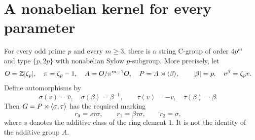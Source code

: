 \section{A nonabelian kernel for every parameter}
\begin{theorem}\label{F1.Construction}
For every odd prime $p$ and every $m\geq3$, there is a string
C-group of order $4p^m$ and type $\{p,2p\}$ with nonabelian
Sylow $p$-subgroup. More precisely, let
\[
 O=\mathbb Z[\zeta_p],\quad \pi=\zeta_p-1,\quad
 A=O/\pi^{m-1}O,\quad P=A\rtimes\langle \beta\rangle,
 \qquad |\beta|=p,\quad v^\beta=\zeta_pv.
\]
Define automorphisms by
\[
 \sigma(v)=\overline v,\quad\sigma(\beta)=\beta^{-1},
 \qquad\tau(v)=-v,\quad\tau(\beta)=\beta.
\]
Then $G=P\rtimes\langle \sigma,\tau\rangle$ has the required marking
\[
 r_0=s\tau\sigma,\qquad r_1=\beta\tau\sigma,\qquad r_2=\sigma,
\]
where $s$ denotes the additive class of the ring element $1$.
It is not the identity of the additive group $A$.
\end{theorem}
